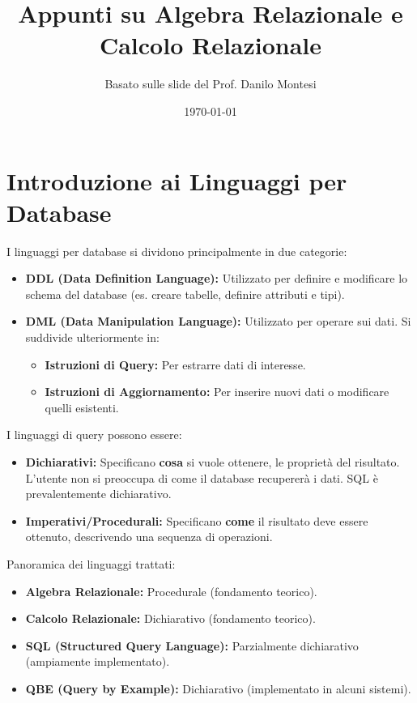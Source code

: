\documentclass{article}
\title{Appunti su Algebra Relazionale e Calcolo Relazionale}
\author{Basato sulle slide del Prof. Danilo Montesi}
\date{\today}
\begin{document}
	
	\maketitle
	\tableofcontents
	\newpage
	
	\section{Introduzione ai Linguaggi per Database}
	
	I linguaggi per database si dividono principalmente in due categorie:
	\begin{itemize}
		\item \textbf{DDL (Data Definition Language):} Utilizzato per definire e modificare lo schema del database (es. creare tabelle, definire attributi e tipi).
		\item \textbf{DML (Data Manipulation Language):} Utilizzato per operare sui dati. Si suddivide ulteriormente in:
		\begin{itemize}
			\item \textbf{Istruzioni di Query:} Per estrarre dati di interesse.
			\item \textbf{Istruzioni di Aggiornamento:} Per inserire nuovi dati o modificare quelli esistenti.
		\end{itemize}
	\end{itemize}
	
	I linguaggi di query possono essere:
	\begin{itemize}
		\item \textbf{Dichiarativi:} Specificano \textbf{cosa} si vuole ottenere, le proprietà del risultato. L'utente non si preoccupa di come il database recupererà i dati. SQL è prevalentemente dichiarativo.
		\item \textbf{Imperativi/Procedurali:} Specificano \textbf{come} il risultato deve essere ottenuto, descrivendo una sequenza di operazioni.
	\end{itemize}
	
	Panoramica dei linguaggi trattati:
	\begin{itemize}
		\item \textbf{Algebra Relazionale:} Procedurale (fondamento teorico).
		\item \textbf{Calcolo Relazionale:} Dichiarativo (fondamento teorico).
		\item \textbf{SQL (Structured Query Language):} Parzialmente dichiarativo (ampiamente implementato).
		\item \textbf{QBE (Query by Example):} Dichiarativo (implementato in alcuni sistemi).
	\end{itemize}
	
\end{document}
